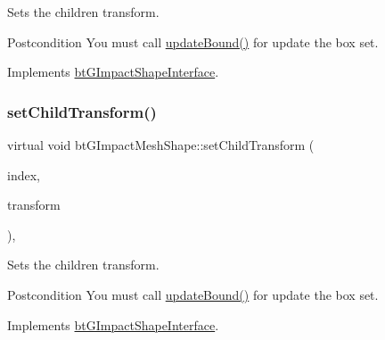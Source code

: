Sets the children transform. 

\begin{DoxyPostcond}{Postcondition}
You must call \hyperlink{classbtGImpactShapeInterface_acb26c2d7a2aecabd06b996b72b848492}{update\+Bound()} for update the box set. 
\end{DoxyPostcond}


Implements \hyperlink{classbtGImpactShapeInterface_a83392f97bd7dfeb71ccdce6913a465b0}{bt\+G\+Impact\+Shape\+Interface}.

\mbox{\label{classbtGImpactMeshShape_a274feed3c9a38a6af5c9f1141ae9ac1a}} 
\subsubsection{\texorpdfstring{set\+Child\+Transform()}{setChildTransform()}\hspace{0.1cm}{\footnotesize\ttfamily [2/2]}}
{\footnotesize\ttfamily virtual void bt\+G\+Impact\+Mesh\+Shape\+::set\+Child\+Transform (\begin{DoxyParamCaption}\item[{int}]{index,  }\item[{const bt\+Transform \&}]{transform }\end{DoxyParamCaption})\hspace{0.3cm}{\ttfamily [inline]}, {\ttfamily [virtual]}}



Sets the children transform. 

\begin{DoxyPostcond}{Postcondition}
You must call \hyperlink{classbtGImpactShapeInterface_acb26c2d7a2aecabd06b996b72b848492}{update\+Bound()} for update the box set. 
\end{DoxyPostcond}


Implements \hyperlink{classbtGImpactShapeInterface_a83392f97bd7dfeb71ccdce6913a465b0}{bt\+G\+Impact\+Shape\+Interface}.

\mbox{\label{classbtGImpactMeshShape_aed8d5e4b2e75538109909d44b244bc35}} 
